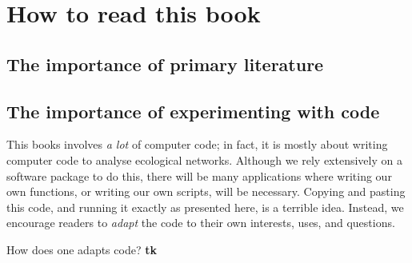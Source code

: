 \section{How to read this book}

\subsection{The importance of primary literature}

\subsection{The importance of experimenting with code}

This books involves \emph{a lot} of computer code; in fact, it is mostly about
writing computer code to analyse ecological networks. Although we rely
extensively on a software package \parencite{poisot_ecologicalnetworks.jl_2019}
to do this, there will be many applications where writing our own functions, or
writing our own scripts, will be necessary. Copying and pasting this code, and
running it exactly as presented here, is a terrible idea. Instead, we encourage
readers to \emph{adapt} the code to their own interests, uses, and questions.

How does one adapts code? \textbf{tk}
